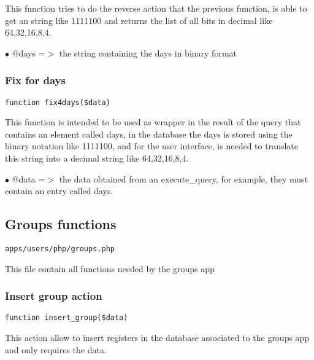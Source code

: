 \documentclass[a4paper]{article}
\begin{document}
This function tries to do the reverse action that the previous function,
is able to get an string like 1111100 and returns the list of all bits in
decimal like 64,32,16,8,4.

\begin{compactitem}
\item[\color{myblue}$\bullet$] @days =$>$ the string containing the days in binary format
\end{compactitem}

\hypertarget{toc171}{}
\subsubsection{Fix for days}

\begin{lstlisting}
function fix4days($data)
\end{lstlisting}

This function is intended to be used as wrapper in the result of the query
that contains an element called days, in the database the days is stored
using the binary notation like 1111100, and for the user interface, is needed
to translate this string into a decimal string like 64,32,16,8,4.

\begin{compactitem}
\item[\color{myblue}$\bullet$] @data =$>$ the data obtained from an execute\_query, for example, they must contain
         an entry called days.
\end{compactitem}

\hypertarget{toc172}{}
\subsection{Groups functions}

\begin{lstlisting}
apps/users/php/groups.php
\end{lstlisting}

This file contain all functions needed by the groups app

\hypertarget{toc173}{}
\subsubsection{Insert group action}

\begin{lstlisting}
function insert_group($data)
\end{lstlisting}

This action allow to insert registers in the database associated to
the groups app and only requires the data.
\end{document}
